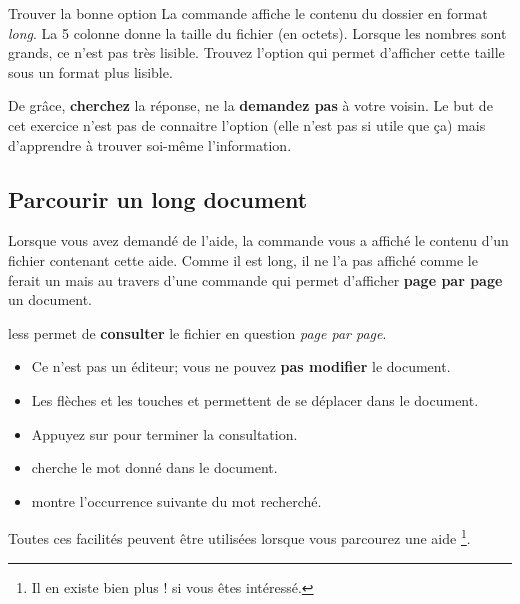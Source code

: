 \documentclass[a4paper,11pt]{style-esi/td}
\begin{document}
		\begin{Exercice}{Trouver la bonne option} 
			La commande  
			affiche le contenu du dossier en format \textit{long}.
			La 5\ieme{} colonne donne la taille du fichier (en octets).
			Lorsque les nombres sont grands, ce n'est pas très lisible. 
			Trouvez l'option qui permet d'afficher cette taille sous un format plus lisible.  
			
			\begin{alertbox} 
				De grâce, \textbf{cherchez} la réponse, 
				ne la \textbf{demandez pas} à votre voisin. 
				Le but de cet exercice n'est pas de connaitre l'option 
				(elle n'est pas si utile que \c ca) 
				mais d'apprendre à trouver soi-même l'information.  
			\end{alertbox}
		\end{Exercice}

	\subsection{Parcourir un long document}  

		Lorsque vous avez demandé de l'aide, 
		la commande  vous a affiché 
		le contenu d'un fichier contenant cette aide.
		Comme il est long, il ne l'a pas affiché comme le ferait un 
		mais au travers d'une commande 
		qui permet d'afficher \textbf{page par page} un document.

		\begin{theorie}{less}
			permet de \textbf{consulter} le fichier en question \emph{page par page}.
			\begin{itemize}
			\item
				Ce n'est pas un éditeur; vous ne pouvez \textbf{pas modifier} le document.
			\item 
				Les flèches et les touches  et 
				permettent de se déplacer dans le document.
			\item 
				Appuyez sur  pour terminer la consultation. 
			\item 
				 cherche le mot donné dans le document.
			\item 
				 montre l'occurrence suivante du mot recherché.
			\end{itemize}
		\end{theorie}

		Toutes ces facilités peuvent être utilisées lorsque vous parcourez
		une aide%
		\footnote{%
			Il en existe bien plus !  si vous êtes intéressé.
		}.
\end{document}
